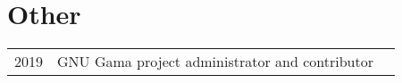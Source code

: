 \documentclass[letterpaper]{deedy-resume} %
\begin{document}
\begin{minipage}[t]{0.66\textwidth}
\sectionspace %


\section{Other} 

\begin{tabular}{rll}
2019	 & GNU Gama project administrator and contributor \\
\end{tabular}

\sectionspace %


%
%


\end{minipage} %




\end{document}
